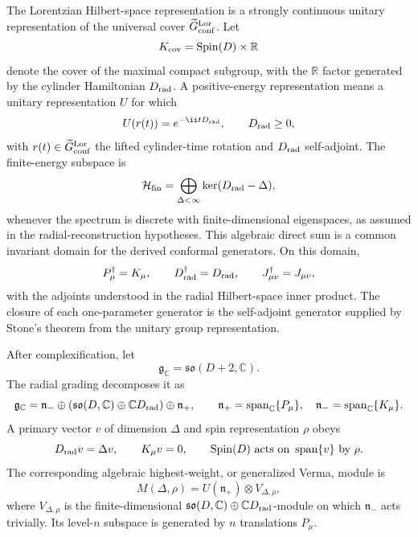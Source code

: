 \begin{definition}
\label{def:positive-energy-lorentzian-conformal-representation}
The Lorentzian Hilbert-space representation is a strongly continuous unitary
representation of the universal cover
\(\widetilde G_{\rm conf}^{\rm Lor}\).  Let
\[
  K_{\rm cov}=\operatorname{Spin}(D)\times\mathbb R
\]
denote the cover of the maximal compact subgroup, with the \(\mathbb R\)
factor generated by the cylinder Hamiltonian \(D_{\rm rad}\).  A positive-energy
representation means a unitary representation \(U\) for which
\[
  U(r(t))=e^{-\ii tD_{\rm rad}},\qquad
  D_{\rm rad}\ge0,
\]
with \(r(t)\in\widetilde G_{\rm conf}^{\rm Lor}\) the lifted cylinder-time
rotation and \(D_{\rm rad}\) self-adjoint.  The finite-energy subspace is
\begin{equation}
  \mathcal H_{\rm fin}
  =
  \bigoplus_{\Delta<\infty}\ker(D_{\rm rad}-\Delta),
  \label{eq:finite-energy-conformal-subspace}
\end{equation}
whenever the spectrum is discrete with finite-dimensional eigenspaces, as
assumed in the radial-reconstruction hypotheses.  This algebraic direct sum is
a common invariant domain for the derived conformal generators.  On this
domain,
\[
  P_\mu^\dagger=K_\mu,\qquad
  D_{\rm rad}^\dagger=D_{\rm rad},\qquad
  J_{\mu\nu}^\dagger=J_{\mu\nu},
\]
with the adjoints understood in the radial Hilbert-space inner product.  The
closure of each one-parameter generator is the self-adjoint generator supplied
by Stone's theorem from the unitary group representation.
\end{definition}

\begin{definition}
\label{def:chapter2-conformal-generalized-verma-module}
After complexification, let
\[
  \mathfrak g_\mathbb C=\mathfrak{so}(D+2,\mathbb C).
\]
The radial grading decomposes it as
\begin{equation}
  \mathfrak g_\mathbb C
  =
  \mathfrak n_-\oplus
  (\mathfrak{so}(D,\mathbb C)\oplus\mathbb C D_{\rm rad})
  \oplus \mathfrak n_+,
  \qquad
  \mathfrak n_+=\operatorname{span}_{\mathbb C}\{P_\mu\},\quad
  \mathfrak n_-=\operatorname{span}_{\mathbb C}\{K_\mu\}.
  \label{eq:conformal-triangular-decomposition}
\end{equation}
A primary vector \(v\) of dimension \(\Delta\) and spin representation
\(\rho\) obeys
\[
  D_{\rm rad}v=\Delta v,\qquad
  K_\mu v=0,\qquad
  \operatorname{Spin}(D)\text{ acts on }\operatorname{span}\{v\}\text{ by }\rho .
\]
The corresponding algebraic highest-weight, or generalized Verma, module is
\begin{equation}
  M(\Delta,\rho)
  =
  U(\mathfrak n_+)\otimes V_{\Delta,\rho},
  \label{eq:chapter2-conformal-generalized-verma-module}
\end{equation}
where \(V_{\Delta,\rho}\) is the finite-dimensional
\(\mathfrak{so}(D,\mathbb C)\oplus\mathbb C D_{\rm rad}\)-module on which
\(\mathfrak n_-\) acts trivially.  Its level-\(n\) subspace is generated by
\(n\) translations \(P_\mu\).
\end{definition}

